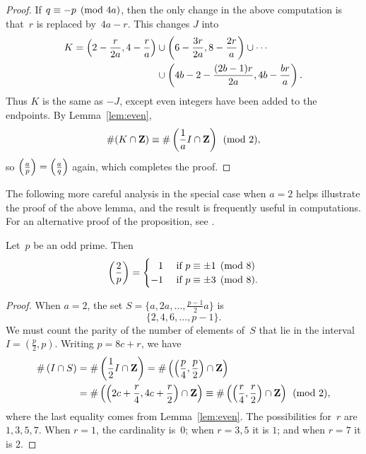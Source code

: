 \begin{proof}
If $q\equiv -p\pmod{4a}$, then the only change in the above computation
is that~$r$ is replaced by~$4a-r$.  This changes $J$ into
\begin{align*}
  K = \left(2-\frac{r}{2a},4-\frac{r}{a}\right) &\cup
  \left(6-\frac{3r}{2a},8-\frac{2r}{a}\right) \cup
  \cdots\\
  &\cup \left(4b-2-\frac{(2b-1)r}{2a},4b-\frac{br}{a}\right).
\end{align*}
Thus $K$ is the same as $-J$, except even integers have
been added to the endpoints.  By Lemma~\ref{lem:even},
$$\#(K\cap \mathbf{Z})\equiv
\#\left(\frac{1}{a}I\cap\mathbf{Z}\right)\pmod{2},$$
so
$\left(\frac{a}{p}\right) = \left(\frac{a}{q}\right)$ again, which completes the proof.
\end{proof}

The following more careful analysis in the special case when $a=2$
helps illustrate the proof of the above lemma, and the result is
frequently useful in computations.  For an alternative proof
of the proposition, see .
\begin{proposition}%
\label{prop:p2}
Let~$p$ be an odd prime.  Then
$$
\kr{2}{p} = \begin{cases} \hfill1 & \text{ if } p\con \pm 1\pmod{8}\\
                         -1 & \text{ if } p\con \pm 3\pmod{8}.  \end{cases}
$$
\end{proposition}
\begin{proof}
When $a=2$, the set $S = \{a,2a,\ldots,\frac{p-1}{2}a\}$ is
$$
\{ 2, 4, 6, \ldots, p-1 \}.
$$
We must count the parity of the number of elements of~$S$ that lie
in the interval $I=(\frac{p}{2}, p)$.  Writing $p=8c+r$, we have
\begin{align*}
\#\left(I\cap S\right) &=\#\left(\frac{1}{2}I \cap \mathbf{Z}\right)
=\#\left(\left(\frac{p}{4},\frac{p}{2}\right)\cap \mathbf{Z}\right)\\
&=\#\left(\left(2c+\frac{r}{4}, 4c+\frac{r}{2}\right)\cap \mathbf{Z}\right) \equiv \#\left(\left(\frac{r}{4}, \frac{r}{2}\right)\cap \mathbf{Z}\right) \pmod{2},
\end{align*}
where the last equality comes from Lemma~\ref{lem:even}.  The
possibilities for~$r$ are $1,3,5,7$.  When $r=1$, the cardinality
is~$0$; when $r=3, 5$ it is $1$; and when $r=7$ it is $2$.
\end{proof}


